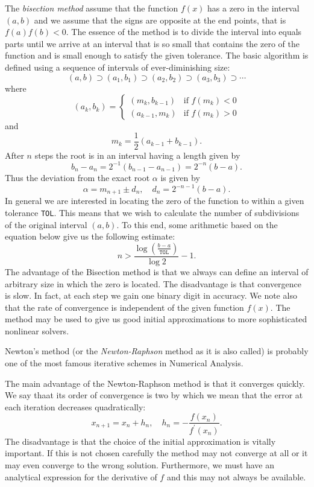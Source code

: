 The \emph{bisection method} assume that the function $f\left(x\right)$ has a zero in the interval $\left(a,b\right)$ and we assume that the signs are opposite at the end points, that is $f\left(a\right)f\left(b\right)<0$. The essence of the method is to divide the interval into equals parts until we arrive at an interval that is so small that contains the zero of the function and is small enough to satisfy the given tolerance. The basic algorithm is defined using a sequence of intervals of ever-diminishing size: \[ \left(a,b\right)\supset\left(a_{1},b_{1}\right)\supset\left(a_{2},b_{2}\right)\supset\left(a_{3},b_{3}\right)\supset\cdots \] where \[ \left(a_{k},b_{k}\right)=\begin{cases}\left(m_{k},b_{k-1}\right)&\text{if }f\left(m_{k}\right)<0\\\left(a_{k-1},m_{k}\right)&\text{if }f\left(m_{k}\right)>0\end{cases} \] and \[ m_{k}=\frac{1}{2}\left(a_{k-1}+b_{k-1}\right). \] After $n$ steps the root is in an interval having a length given by \[ b_{n}-a_{n}=2^{-1}\left(b_{n-1}-a_{n-1}\right)=2^{-n}\left(b-a\right). \] Thus the deviation from the exact root $\alpha$ is given by \[ \alpha = m_{n+1}\pm d_{n},\quad d_{n}=2^{-n-1}\left(b-a\right). \] In general we are interested in locating the zero of the function to within a given tolerance \texttt{TOL}. This means that we wish to calculate the number of subdivisions of the original interval $\left(a,b\right)$. To this end, some arithmetic based on the equation below give us the following estimate: \[ n>\frac{\log\left(\frac{b-a}{\texttt{TOL}}\right)}{\log2}-1. \] The advantage of the Bisection method is that we always can define an interval of arbitrary size in which the zero is located. The disadvantage is that convergence is slow. In fact, at each step we gain one binary digit in accuracy. We note also that the rate of convergence is independent of the given function $f\left(x\right)$. The method may be used to give us good initial approximations to more sophisticated nonlinear solvers.

Newton's method (or the \emph{Newton-Raphson} method as it is also called) is probably one of the most famous iterative schemes in Numerical Analysis.

The main advantage of the Newton-Raphson method is that it converges quickly. We say thaat its order of convergence is two by which we mean that the error at each iteration decreases quadratically: \[ x_{n+1}=x_{n}+h_{n},\quad h_{n}=-\frac{f\left(x_{n}\right)}{f^{\prime}\left(x_{n}\right)}. \] The disadvantage is that the choice of the initial approximation is vitally important. If this is not chosen carefully the method may not converge at all or it may even converge to the wrong solution. Furthermore, we must have an analytical expression for the derivative of $f$ and this may not always be available.

